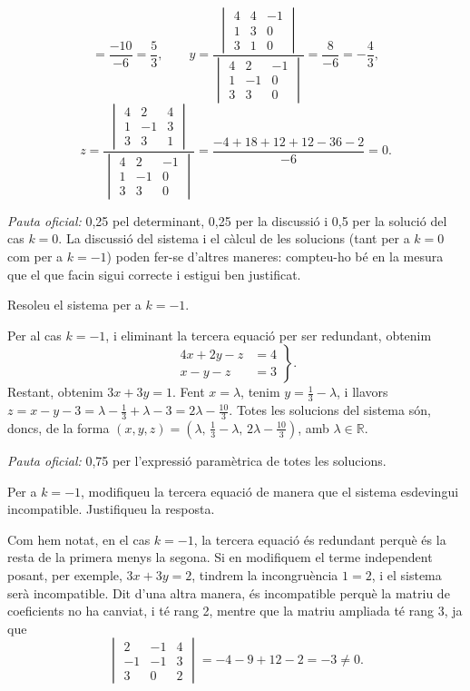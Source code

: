 \begin{apartats}
\begin{solucio}
\[=\frac{-10}{-6}=\frac53,\qquad
y=\frac{\begin{vmatrix}4&4&-1\\1&3&0\\3&1&0\end{vmatrix}}{\begin{vmatrix}4&2&-1\\1&-1&0\\3&3&0\end{vmatrix}}
=\frac{8}{-6}=-\frac43,
\]
\[
z=\frac{\begin{vmatrix}4&2&4\\1&-1&3\\3&3&1\end{vmatrix}}{\begin{vmatrix}4&2&-1\\1&-1&0\\3&3&0\end{vmatrix}}
=\frac{-4+18+12+12-36-2}{-6}=0 .
\]

\textit{Pauta oficial:} 0,25 pel determinant, 0,25 per la discussió i 0,5 per la solució del cas $k=0$. La
discussió del sistema i el càlcul de les solucions (tant per a $k=0$ com per a $k=-1$) poden fer-se d'altres
maneres: compteu-ho bé en la mesura que el que facin sigui correcte i estigui ben justificat.
\end{solucio}

Resoleu el sistema per a $k=-1$.

\begin{solucio}
Per al cas $k=-1$, i eliminant la tercera equació per ser redundant, obtenim
\[
\left.\begin{aligned}4x+2y-z&=4\\x-y-z&=3\end{aligned}\right\}.
\]
Restant, obtenim $3x+3y=1$. Fent $x=\lambda$, tenim $y=\frac13-\lambda$, i llavors
$z=x-y-3=\lambda-\frac13+\lambda-3=2\lambda-\frac{10}{3}$. Totes les solucions del sistema són, doncs, de la forma
$(x,y,z)=\left(\lambda,\,\frac13-\lambda,\,2\lambda-\frac{10}{3}\right)$, amb $\lambda\in\mathbb{R}$.

\textit{Pauta oficial:} 0,75 per l'expressió paramètrica de totes les solucions.
\end{solucio}

Per a $k=-1$, modifiqueu la tercera equació de manera que el sistema esdevingui incompatible. Justifiqueu la
resposta.

\begin{solucio}
Com hem notat, en el cas $k=-1$, la tercera equació és redundant perquè és la resta de la primera menys la
segona. Si en modifiquem el terme independent posant, per exemple, $3x+3y=2$, tindrem la incongruència $1=2$, i
el sistema serà incompatible. Dit d'una altra manera, és incompatible perquè la matriu de coeficients no ha
canviat, i té rang 2, mentre que la matriu ampliada té rang 3, ja que
\[
\begin{vmatrix}2&-1&4\\-1&-1&3\\3&0&2\end{vmatrix}=-4-9+12-2=-3\neq0 .
\]


\end{solucio}
\end{apartats}
